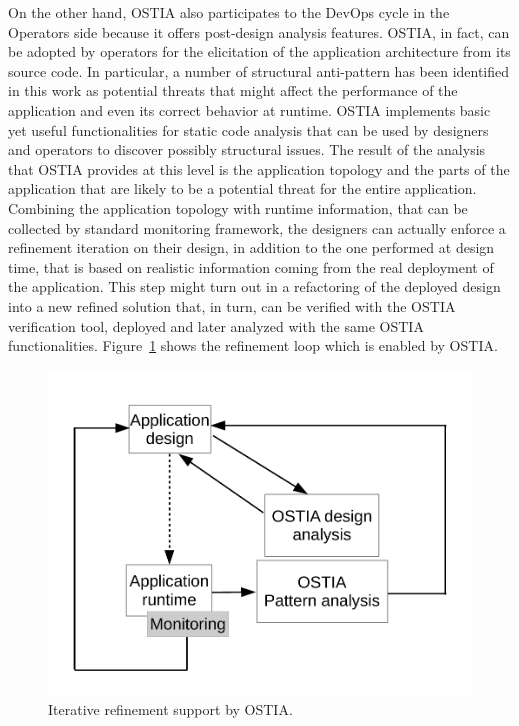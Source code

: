 \documentclass[smallextended]{svjour3}       %
\begin{document}
{On the other hand, OSTIA  also participates to the DevOps cycle in the Operators side because it offers post-design analysis features.
OSTIA, in fact, can be adopted by operators for the elicitation of the application architecture from its source code.
In particular, a number of structural anti-pattern has been identified in this work as potential threats that might affect the performance of the application and even its correct behavior at runtime.
OSTIA implements basic yet useful functionalities for static code analysis that can be used by designers and operators to discover possibly structural issues.
The result of the analysis that OSTIA provides at this level is the application topology and the parts of the application that are likely to be a potential threat for the entire application. 
Combining the application topology with runtime information, that can be collected by standard monitoring framework, the designers can actually enforce a refinement iteration on their design, in addition to the one performed at design time, that is based on realistic information coming from the real deployment of the application.
This step might turn out in a refactoring of the deployed design into a new refined solution that, in turn, can be verified with the OSTIA verification tool, deployed and later analyzed with the same OSTIA functionalities.
Figure~\ref{fig:iterative-refinement} shows the refinement loop which is enabled by OSTIA.
\begin{figure}
	\centering
	\includegraphics[scale=0.35,draft]{fig1}
	\caption{Iterative refinement support by OSTIA.}
	\label{fig:iterative-refinement}
\end{figure}

}
\end{document}
